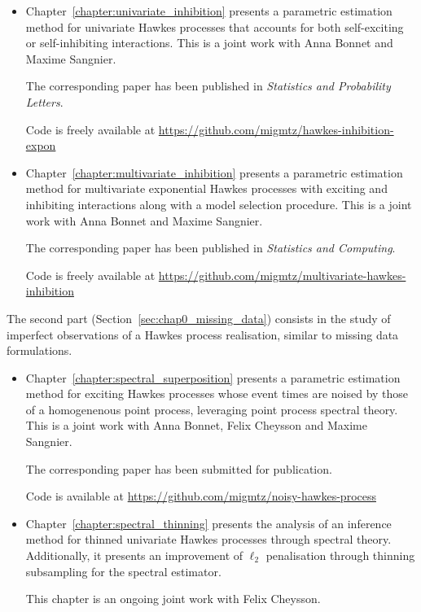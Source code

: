     \begin{itemize}
      \item Chapter~\ref{chapter:univariate_inhibition} presents a parametric estimation method for univariate Hawkes processes that accounts for both self-exciting or self-inhibiting interactions. 
      This is a joint work with Anna Bonnet and Maxime Sangnier. 

      The corresponding paper \parencite{bonnet2021} has been published in \textit{Statistics and Probability Letters}.
      
      Code is freely available at \url{https://github.com/migmtz/hawkes-inhibition-expon}

      \item Chapter~\ref{chapter:multivariate_inhibition} presents a parametric estimation method for multivariate exponential Hawkes processes with exciting and inhibiting interactions along with a model selection procedure. 
      This is a joint work with Anna Bonnet and Maxime Sangnier. 

      The corresponding paper \parencite{Bonnet2023} has been published in \textit{Statistics and Computing}.
      
      Code is freely available at \url{https://github.com/migmtz/multivariate-hawkes-inhibition}

    \end{itemize}

    The second part (Section~\ref{sec:chap0_missing_data}) consists in the study of imperfect observations of a Hawkes process realisation, similar to missing data formulations.

    \begin{itemize}
      \item Chapter~\ref{chapter:spectral_superposition} presents a parametric estimation method for exciting Hawkes processes whose event times are noised by those of a homogenenous point process, leveraging point process spectral theory. 
      This is a joint work with Anna Bonnet, Felix Cheysson and Maxime Sangnier. 

      The corresponding paper \parencite{Bonnet2024} has been submitted for publication.

      Code is available at \url{https://github.com/migmtz/noisy-hawkes-process}

      \item Chapter~\ref{chapter:spectral_thinning} presents the analysis of an inference method for thinned univariate Hawkes processes through spectral theory. 
      Additionally, it presents an improvement of $\ell_2$ penalisation through thinning subsampling for the spectral estimator.

      This chapter is an ongoing joint work with Felix Cheysson.
    \end{itemize}





